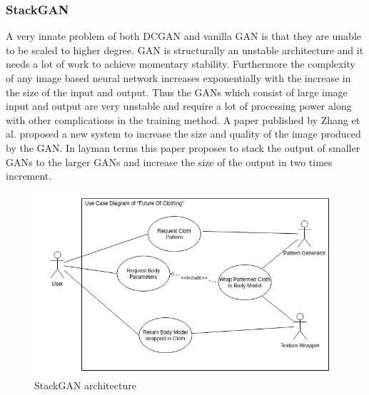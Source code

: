 \documentclass{article}
\begin{document}
\subsubsection{StackGAN}
A very innate problem of both DCGAN and vanilla GAN is that they are unable to be scaled to higher degree. GAN is structurally an unstable architecture and it needs a lot of work to achieve momentary stability. Furthermore the complexity of any image based neural network increases exponentially with the increase in the size of the input and output. Thus the GANs which consist of large image input and output are very unstable and require a lot of processing power along with other complications in the training method. \cite{zhang2016stackgan} A paper published by Zhang et al. proposed a new system to increase the size and quality of the image produced by the GAN. In layman terms this paper proposes to stack the output of smaller GANs to the larger GANs and increase the size of the output in two times increment.
\begin{figure}[h]
    \includegraphics[scale=0.5]{images/softwareDiagrams/FinalSystemUseCase.png}
    \centering
    \caption{StackGAN architecture}    
\end{figure}
\end{document}
